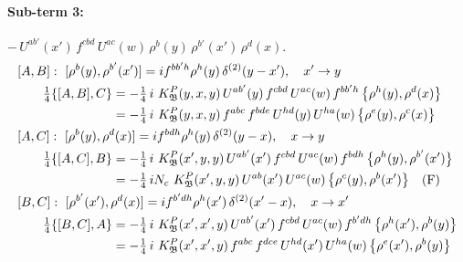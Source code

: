\documentclass[10pt]{article}
\numberwithin{equation}{section}
\begin{document}
\paragraph{Sub-term 3:} $-\,U^{ab'}(x')\,f^{cbd}\,U^{ac}(w)\,\rho^{b}(y)\,\rho^{b'}(x')\,\rho^{d}(x)$.
\begin{align}
&[A,B]:\ [\rho^{b}(y),\rho^{b'}(x')]=i f^{bb'h}\rho^{h}(y)\,\delta^{(2)}(y-x'),\quad x'\to y\notag\\
&\qquad \tfrac14\{[A,B],C\}=-\tfrac14\,i\,\,K^{P}_{\mathfrak B}(y,x,y)\,U^{ab'}(y)\,f^{cbd}\,U^{ac}(w)\,f^{bb'h}\,\big\{\rho^{h}(y),\rho^{d}(x)\big\}\notag\\
&\qquad\phantom{\tfrac14\{[A,B],C\}}=-\tfrac14\,i\,\,K^{P}_{\mathfrak B}(y,x,y)\,f^{abc}\,f^{bde}\,U^{hd}(y)\,U^{ha}(w)\,\big\{\rho^{e}(y),\rho^{c}(x)\big\}
\label{eq:GIII.II.P-3-AB}\\
&[A,C]:\ [\rho^{b}(y),\rho^{d}(x)]=i f^{bdh}\rho^{h}(y)\,\delta^{(2)}(y-x),\quad x\to y\notag\\
&\qquad \tfrac14\{[A,C],B\}=-\tfrac14\,i\,\,K^{P}_{\mathfrak B}(x',y,y)\,U^{ab'}(x')\,f^{cbd}\,U^{ac}(w)\,f^{bdh}\,\big\{\rho^{h}(y),\rho^{b'}(x')\big\}\notag\\
&\qquad\phantom{\tfrac14\{[A,C],B\}}=-\tfrac14\,i N_{c}\,\,K^{P}_{\mathfrak B}(x',y,y)\,U^{ab}(x')\,U^{ac}(w)\,\big\{\rho^{c}(y),\rho^{b}(x')\big\}\quad\text{(F)}
\label{eq:GIII.II.P-3-AC}\\
&[B,C]:\ [\rho^{b'}(x'),\rho^{d}(x)]=i f^{b'dh}\rho^{h}(x')\,\delta^{(2)}(x'-x),\quad x\to x'\notag\\
&\qquad \tfrac14\{[B,C],A\}=-\tfrac14\,i\,\,K^{P}_{\mathfrak B}(x',x',y)\,U^{ab'}(x')\,f^{cbd}\,U^{ac}(w)\,f^{b'dh}\,\big\{\rho^{h}(x'),\rho^{b}(y)\big\}\notag\\
&\qquad\phantom{\tfrac14\{[B,C],A\}}=-\tfrac14\,i\,\,K^{P}_{\mathfrak B}(x',x',y)\,f^{abc}\,f^{dce}\,U^{hd}(x')\,U^{ha}(w)\,\big\{\rho^{e}(x'),\rho^{b}(y)\big\}
\label{eq:GIII.II.P-3-BC}
\end{align}
\end{document}
